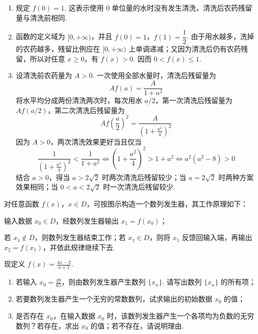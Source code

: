 \begin{solution}
\begin{enumerate}
\item 规定 \(f(0)=1\). 这表示使用 \(0\) 单位量的水时没有发生清洗，清洗后农药残留量与清洗前相同.
\item 函数的定义域为 \([0,+\infty)\)，并且 \(f(0)=1\)，\(f(1)=\dfrac{1}{2}\). 由于用水越多，洗掉的农药越多，残留比例应在 \([0,+\infty)\) 上单调递减；又因为清洗后仍有农药残留，所以对任意 \(x\geqslant0\)，有 \(f(x)>0\). 因而 \(0<f(x)\leqslant1\).
\item 设清洗前农药量为 \(A>0\). 一次使用全部水量时，清洗后残留量为
\[
A f(a)=\frac{A}{1+a^2}
\]
将水平均分成两份清洗两次时，每次用水 \(a/2\)，第一次清洗后残留量为 \(A f(a/2)\)，第二次清洗后残留量为
\[
A f\left(\frac{a}{2}\right)^2=\frac{A}{\left(1+\frac{a^2}{4}\right)^2}
\]
因为 \(A>0\)，两次清洗效果更好当且仅当
\[
\frac{1}{\left(1+\frac{a^2}{4}\right)^2}<\frac{1}{1+a^2}
\Longleftrightarrow \left(1+\frac{a^2}{4}\right)^2>1+a^2
\Longleftrightarrow a^2(a^2-8)>0
\]
结合 \(a>0\)，得当 \(a>2\sqrt{2}\) 时两次清洗后残留较少；当 \(a=2\sqrt{2}\) 时两种方案效果相同；当 \(0<a<2\sqrt{2}\) 时一次清洗后残留较少.
\end{enumerate}
\end{solution}

\begin{problem}
对任意函数 \(f(x)\)，\(x\in D\)，可按图示构造一个数列发生器，其工作原理如下：
\begin{circlelist}
\item 输入数据 \(x_0\in D\)，经数列发生器输出 \(x_1=f(x_0)\)；
\item 若 \(x_1\notin D\)，则数列发生器结束工作；若 \(x_1\in D\)，则将 \(x_1\) 反馈回输入端，再输出 \(x_2=f(x_1)\)，并依此规律继续下去.
\end{circlelist}
现定义 \(f(x)=\frac{4x-2}{x+1}\).

\begin{enumerate}
\item 若输入 \(x_0=\frac{49}{65}\)，则由数列发生器产生数列 \(\{x_n\}\). 请写出数列 \(\{x_n\}\) 的所有项；
\item 若要数列发生器产生一个无穷的常数数列，试求输出的初始数据 \(x_0\) 的值；
\item 是否存在 \(x_0\)，在输入数据 \(x_0\) 时，该数列发生器产生一个各项均为负数的无穷数列？若存在，求出 \(x_0\) 的值；若不存在，请说明理由.
\end{enumerate}

\end{problem}


